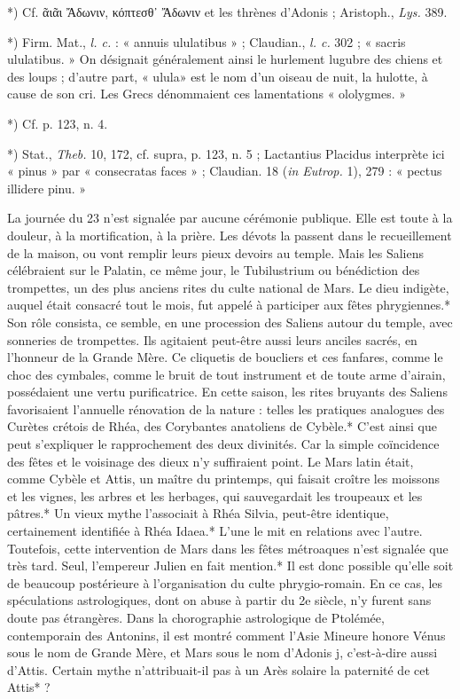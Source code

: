 \documentclass[a4paper, 11pt, oneside, polutonikogreek, french]{article}
\begin{document}
*) Cf. ᾶιᾶι Ἄδωνιν, κόπτεσθ᾽ Ἄδωνιν et les thrènes d'Adonis ; Aristoph., \emph{Lys.} 389.

*) Firm. Mat., \emph{l. c.} : « annuis ululatibus » ; Claudian., \emph{l. c.} 302 ; « sacris ululatibus. » On désignait généralement ainsi le hurlement lugubre des chiens et des loups ; d'autre part, « ulula» est le nom d'un oiseau de nuit, la hulotte, à cause de son cri. Les Grecs dénommaient ces lamentations « ololygmes. »

*) Cf. p. 123, n. 4.

*) Stat., \emph{Theb.} 10, 172, cf. supra, p. 123, n. 5 ; Lactantius Placidus interprète ici « pinus » par « consecratas faces » ; Claudian. 18 (\emph{in Eutrop.} 1), 279 : « pectus illidere pinu. »

La journée du 23 n'est signalée par aucune cérémonie publique. Elle est toute à la douleur, à la mortification, à la prière. Les dévots la passent dans le recueillement de la maison, ou vont remplir leurs pieux devoirs au temple. Mais les Saliens célébraient sur le Palatin, ce même jour, le Tubilustrium ou bénédiction des trompettes, un des plus anciens rites du culte national de Mars. Le dieu indigète, auquel était consacré tout le mois, fut appelé à participer aux fêtes phrygiennes.* Son rôle consista, ce semble, en une procession des Saliens autour du temple, avec sonneries de trompettes. Ils agitaient peut-être aussi leurs anciles sacrés, en l'honneur de la Grande Mère. Ce cliquetis de boucliers et ces fanfares, comme le choc des cymbales, comme le bruit de tout instrument et de toute arme d'airain, possédaient une vertu purificatrice. En cette saison, les rites bruyants des Saliens favorisaient l'annuelle rénovation de la nature : telles les pratiques analogues des Curètes crétois de Rhéa, des Corybantes anatoliens de Cybèle.* C'est ainsi que peut s'expliquer le rapprochement des deux divinités. Car la simple coïncidence des fêtes et le voisinage des dieux n'y suffiraient point. Le Mars latin était, comme Cybèle et Attis, un maître du printemps, qui faisait croître les moissons et les vignes, les arbres et les herbages, qui sauvegardait les troupeaux et les pâtres.* Un vieux mythe l'associait à Rhéa Silvia, peut-être identique, certainement identifiée à Rhéa Idaea.* L'une le mit en relations avec l'autre. Toutefois, cette intervention de Mars dans les fêtes métroaques n'est signalée que très tard. Seul, l'empereur Julien en fait mention.* Il est donc possible qu'elle soit de beaucoup postérieure à l'organisation du culte phrygio-romain. En ce cas, les spéculations astrologiques, dont on abuse à partir du 2e siècle, n'y furent sans doute pas étrangères. Dans la chorographie astrologique de Ptolémée, contemporain des Antonins, il est montré comment l'Asie Mineure honore Vénus sous le nom de Grande Mère, et Mars sous le nom d'Adonis j, c'est-à-dire aussi d'Attis. Certain mythe n'attribuait-il pas à un Arès solaire la paternité de cet Attis* ?
\end{document}
